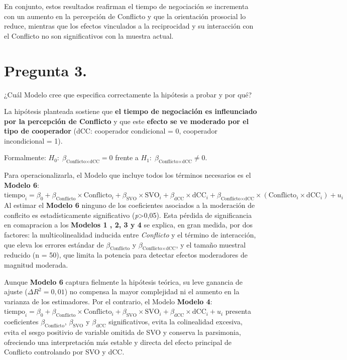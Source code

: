 \documentclass[
  spanish,
  10pt,
]{article}
\begin{document}
En conjunto, estos resultados reafirman el tiempo de negociación se
incrementa con un aumento en la percepción de Conflicto y que la
orientación prosocial lo reduce, mientras que los efectos vinculados a
la reciprocidad y su interacción con el Conflicto no son significativos
con la muestra actual.

\section{Pregunta 3.}\label{pregunta-3.}

¿Cuál Modelo cree que especifica correctamente la hipótesis a probar y
por qué?

La hipótesis planteada sostiene que \textbf{el tiempo de negociación es
infleunciado por la percepción de Conflicto} y que este \textbf{efecto
se ve moderado por el tipo de cooperador} (dCC: cooperador condicional =
0, cooperador incondicional = 1).

Formalmente: \(H_0:\;\beta_{\text{Conflicto}\times\text{dCC}} = 0\)
frente a \(H_1:\;\beta_{\text{Conflicto}\times\text{dCC}} \neq 0\).

Para operacionalizarla, el Modelo que incluye todos los términos
necesarios es el \textbf{Modelo 6}:
\(\text{tiempo}_i = \beta_0 + \beta_{\text{Conflicto}}\times\text{Conflicto}_i + \beta_{\text{SVO}}\times\text{SVO}_i + \beta_{\text{dCC}}\times\text{dCC}_i + \beta_{\text{Conflicto}\times\text{dCC}}\times(\text{Conflicto}_i\times\text{dCC}_i) + u_i\)
Al estimar el \textbf{Modelo 6} ninguno de los coeficientes asociados a
la moderación de conflcito es estadísticamente significativo
(\emph{p}\textgreater0,05). Esta pérdida de significancia en comapracion
a los \textbf{Modelos 1 , 2, 3 y 4} se explica, en gran medida, por dos
factores: la multicolinealidad inducida entre \emph{Conflicto} y el
término de interacción, que eleva los errores estándar de
\(\beta_{\text{Conflicto}}\) y
\(\beta_{\text{Conflicto}\times\text{dCC}}\), y el tamaño muestral
reducido (n = 50), que limita la potencia para detectar efectos
moderadores de magnitud moderada.

Aunque \textbf{Modelo 6} captura fielmente la hipótesis teórica, su leve
ganancia de ajuste (\(\Delta R^2 = 0,01\)) no compensa la mayor
complejidad ni el aumento en la varianza de los estimadores. Por el
contrario, el Modelo \textbf{Modelo 4}:
\(\text{tiempo}_i = \beta_0 + \beta_{\text{Conflicto}}\times\text{Conflicto}_i+ \beta_{\text{SVO}}\times\text{SVO}_i+ \beta_{\text{dCC}}\times\text{dCC}_i+ u_i\)
presenta coeficientes \(\beta_{\text{Conflicto}}\),
\(\beta_{\text{SVO}}\) y \(\beta_{\text{dCC}}\) significativos, evita la
colinealidad excesiva, evita el sesgo positivio de variable omitida de
SVO y conserva la parsimonia, ofreciendo una interpretación más estable
y directa del efecto principal de Conflicto controlando por SVO y dCC.
\end{document}
